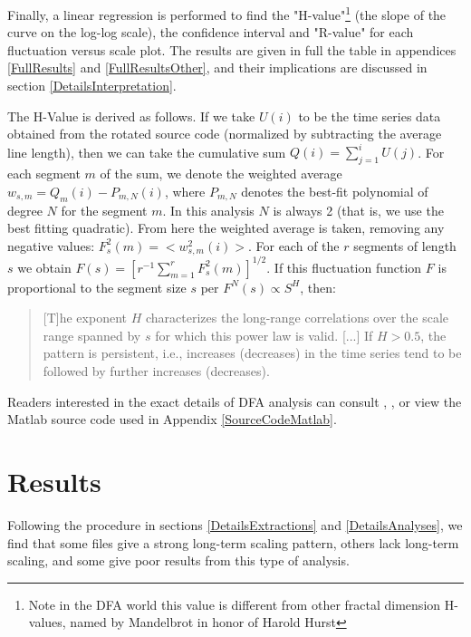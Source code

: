 \documentclass[12pt]{article}
\begin{document}
Finally, a linear regression is performed to find the "H-value"\footnote{Note in the DFA world this value is different from other fractal dimension H-values, named by Mandelbrot in honor of Harold  Hurst} (the slope of the curve on the log-log scale), the confidence interval and "R-value" for each fluctuation versus scale plot.  The results are given in full the table in appendices \ref{FullResults} and \ref{FullResultsOther}, and their implications are discussed in section \ref{DetailsInterpretation}.

\label{DFAHValue}
The H-Value is derived as follows.  If we take $U(i)$ to be the time series data obtained from the rotated source code (normalized by subtracting the average line length), then we can take the cumulative sum $Q(i) = \sum\limits_{j=1}^i U(j)$.  For each segment $m$ of the sum, we denote the weighted average $w_{s,m} = Q_m(i) - P_{m,N}(i)$, where $P_{m,N}$ denotes the best-fit polynomial of degree $N$ for the segment $m$.  In this analysis $N$ is always 2 (that is, we use the best fitting quadratic).  From here the weighted average is taken, removing any negative values: $F^2_s(m) = <w^2_{s,m}(i)>$.  For each of the $r$ segments of length $s$ we obtain $F(s) = [ r^{-1} \sum\limits_{m=1}^r F^2_s(m)]^{1/2}$.  If this fluctuation function $F$ is proportional to the segment size $s$ per $F^N(s) \propto S^H$, then:

\begin{quote}
[T]he exponent $H$ characterizes the long-range correlations over the scale range spanned by
$s$ for which this power law is valid. [...] If $H > 0.5$, the pattern is
persistent, i.e., increases (decreases) in the time series tend to be followed by further
increases (decreases). \cite{Suteanu:AirTemps:14}
\end{quote}

Readers interested in the exact details of DFA analysis can consult \cite{Suteanu:AirTemps:14}, \cite{Kantelhardt:DFA:01}, or view the Matlab source code used in Appendix \ref{SourceCodeMatlab}.

\section{Results}\label{DetailsResults}

Following the procedure in sections \ref{DetailsExtractions} and \ref{DetailsAnalyses}, we find that some files give a strong long-term scaling pattern, others lack long-term scaling, and some give poor results from this type of analysis.
\end{document}
